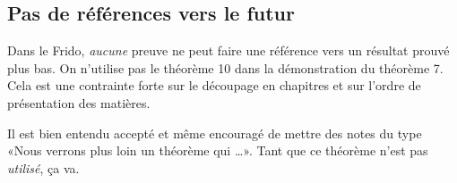 \subsection{Pas de références vers le futur}

Dans le Frido, \emph{aucune} preuve ne peut faire une référence vers un résultat prouvé plus bas. On n'utilise pas le théorème 10 dans la démonstration du théorème 7. Cela est une contrainte forte sur le découpage en chapitres et sur l'ordre de présentation des matières.

Il est bien entendu accepté et même encouragé de mettre des notes du type «Nous verrons plus loin un théorème qui \ldots». Tant que ce théorème n'est pas \emph{utilisé}, ça va.



